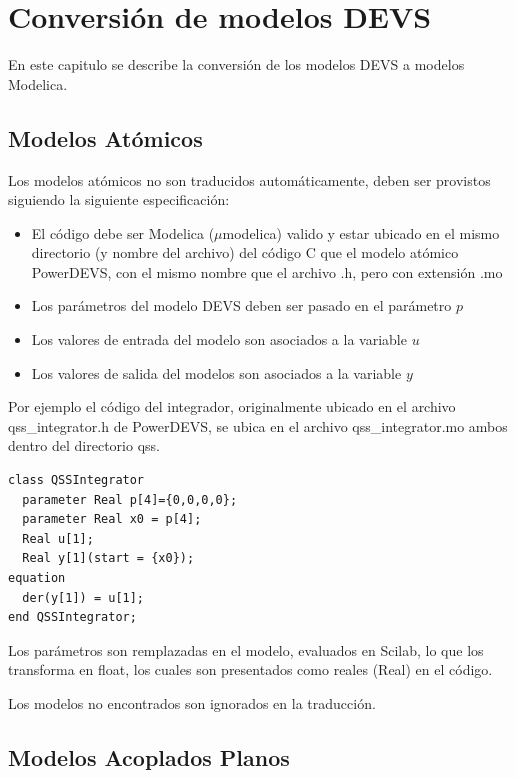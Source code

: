 \documentclass[a4paper,	11pt]{report}
\begin{document}
\chapter{Conversión de modelos DEVS}
En este capitulo se describe la conversión de los modelos DEVS a modelos Modelica.

\section{Modelos Atómicos}
Los modelos atómicos no son traducidos automáticamente, deben ser provistos siguiendo la siguiente especificación:

\begin{itemize}
\item El código debe ser Modelica ($\mu$modelica) valido y estar ubicado en el mismo directorio (y nombre del archivo) del código C que el modelo atómico PowerDEVS, con el mismo nombre que el archivo .h, pero con extensión .mo
\item Los parámetros del modelo DEVS deben ser pasado en el parámetro $p$
\item Los valores de entrada del modelo son asociados a la variable $u$
\item Los valores de salida del modelos son asociados a la variable $y$
\end{itemize}

Por ejemplo el código del integrador, originalmente ubicado en el archivo qss\_integrator.h de PowerDEVS, se ubica en el archivo qss\_integrator.mo ambos dentro del directorio qss.

\begin{verbatim}
class QSSIntegrator
  parameter Real p[4]={0,0,0,0};
  parameter Real x0 = p[4];
  Real u[1];
  Real y[1](start = {x0});
equation
  der(y[1]) = u[1];
end QSSIntegrator;
\end{verbatim}

Los parámetros son remplazadas en el modelo, evaluados en Scilab, lo que los transforma en float, los cuales son presentados como reales (Real) en el código.

Los modelos no encontrados son ignorados en la traducción.

\section{Modelos Acoplados Planos}
\end{document}
